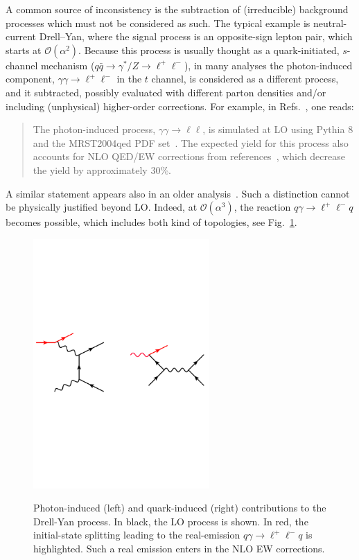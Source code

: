 A common source of inconsistency is the subtraction of (irreducible) background processes which must not be considered as such. The typical example
is neutral-current Drell--Yan, where the signal process is an opposite-sign lepton pair, which starts
at $\mathcal O(\alpha^2)$. Because this process is usually thought
as a quark-initiated, $s$-channel mechanism ($q\bar q \to \gamma^*/Z \to \ell^+ \ell^-$), in many analyses the photon-induced component,
$\gamma \gamma \to \ell^+ \ell^-$ in the $t$ channel, is considered as a different process, and it 
subtracted, possibly evaluated with different parton densities and/or including (unphysical) higher-order 
corrections. For example, in Refs.~\cite{Aaboud:2017ffb,Aad:2016zzw}, one reads:
\begin{quote}
The photon-induced process, $\gamma\gamma \to \ell \ell$, is simulated at LO using Pythia 8 
and the MRST2004qed PDF set~\cite{Martin:2004dh}. The expected yield for this process also accounts for 
NLO QED/EW corrections from references~\cite{Bardin:2012jk,Bondarenko:2013nu}, which decrease the yield by approximately 30\%.
\end{quote}
A similar statement appears also in an older analysis~\cite{Aad:2013iua}. Such a distinction cannot be physically
justified beyond LO\@. Indeed, at $\mathcal O(\alpha^3)$, the reaction $q \gamma \to \ell^+ \ell^- q$ becomes possible, which
includes both kind of topologies, see Fig.~\ref{fig:dy-pi}. 
\begin{figure}[ht!]
    \centering
    \includegraphics[width=0.6\textwidth, trim=0.cm 11cm 0.cm 2cm, clip=True]{figures/dy-pi.pdf}\\
    \caption{\label{fig:dy-pi}
    Photon-induced (left) and quark-induced (right) contributions to the Drell-Yan process. In black, the LO process is shown.
    In red, the initial-state splitting leading to the real-emission $q \gamma \to \ell^+ \ell^- q$ is highlighted. Such a 
    real emission enters in the NLO EW corrections.}
\end{figure}

